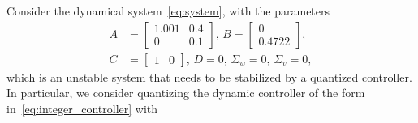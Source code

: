 \documentclass[journal, twoside, web]{ieeecolorpreprint}
\begin{document}
Consider the dynamical system~\eqref{eq:system}, with the parameters
\begin{equation} 
\begin{aligned}
    A & =\begin{bmatrix}
     1.001 &  0.4  \\
      0 &  0.1 
    \end{bmatrix}, \, B = \begin{bmatrix}
            0 \\
     0.4722 
    \end{bmatrix}, \\
     C & = \begin{bmatrix}
        1 &  0
    \end{bmatrix}, \, D = 0, \, \Sigma_w  =0, \, \Sigma_v=0,
\end{aligned} \label{eq:numerical_system}
\end{equation}
which is an unstable system that needs to be stabilized by a quantized controller. In particular, we consider quantizing the dynamic controller of the form in~\eqref{eq:integer_controller}
with
\end{document}
